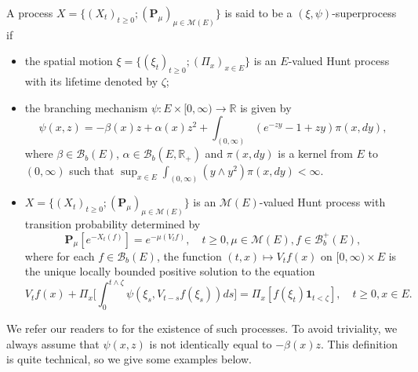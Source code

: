 \documentclass[UTF8]{pkuthss}
\theoremstyle{plain}
\theoremstyle{definition}
\numberwithin{equation}{section}
\begin{document}
	A process $X=\{(X_t)_{t\geq 0}; (\mathbf P_\mu)_{\mu \in \mathcal M(E)}\}$ is said to be a $(\xi,\psi)$-superprocess if
\begin{itemize}
\item
    the spatial motion $\xi=\{(\xi_t)_{t\geq 0};(\Pi_x)_{x\in E}\}$ is an $E$-valued Hunt process with its lifetime denoted by $\zeta$;
\item
    the branching mechanism $\psi: E\times[0,\infty) \to \mathbb R$ is given by
\begin{equation}
    \psi(x,z)=
    -\beta(x) z + \alpha (x) z^2 + \int_{(0,\infty)} (e^{-zy} - 1 + zy) \pi(x,dy),
\end{equation}
    where $\beta \in \mathcal B_b(E)$, $\alpha \in \mathcal B_b(E, \mathbb R_+)$ and $\pi(x,dy)$ is a kernel from $E$ to $(0,\infty)$ such that $\sup_{x\in E} \int_{(0,\infty)} (y\wedge y^2) \pi(x,dy) < \infty$.
\item
    $X=\{(X_t)_{t\geq 0}; (\mathbf P_\mu)_{\mu \in \mathcal M(E)}\}$ is an $\mathcal M(E)$-valued Hunt process with transition probability determined by
\begin{equation}
    \mathbf P_\mu [e^{-X_t(f)}] = e^{-\mu(V_tf)},
    \quad t\geq 0, \mu \in \mathcal M(E), f\in \mathcal B^+_b(E),
\end{equation}
    where for each $f\in \mathcal B_b(E)$, the function $(t,x)\mapsto V_tf(x)$ on $[0,\infty) \times E$ is the unique locally bounded positive solution to the equation
\begin{equation}\label{eq:FKPP_in_definition}
    V_tf(x) + \Pi_x \Big[  \int_0^{t\wedge \zeta} \psi(\xi_s,V_{t-s}f(\xi_s))ds \Big]
    = \Pi_x [ f(\xi_t)\mathbf 1_{t<\zeta} ],
    \quad t \geq 0, x \in E.
\end{equation}
\end{itemize}
    We refer our readers to \cite{Li2011Measure-valued} for the existence of such processes.
    To avoid triviality, we always assume that
    $\psi(x,z)$ is not identically equal to $-\beta(x)z$.
    This definition is quite technical, so we give some examples below.
\end{document}
